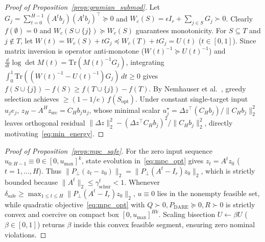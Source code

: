 \documentclass[journal]{IEEEtran}
\begin{document}
\begin{proof}[Proof of Proposition~\ref{prop:gramian_submod}]
Let $G_j = \sum_{t=0}^{H-1}(A^t b_j)(A^t b_j)^\top \succeq 0$ and $W_c(S) = \epsilon I_r + \sum_{j\in S}G_j \succ 0$. Clearly $f(\emptyset) = 0$ and $W_c(S\cup\{j\}) \succeq W_c(S)$ guarantees monotonicity. For $S \subseteq T$ and $j \notin T$, let $W(t) = W_c(S) + t G_j \preceq W_c(T) + t G_j = U(t)$ ($t \in [0, 1]$). Since matrix inversion is operator anti-monotone ($W(t)^{-1} \succeq U(t)^{-1}$) and $\frac{d}{dt}\log\det M(t) = \mathrm{Tr}(M(t)^{-1}G_j)$, integrating $\int_0^1 \mathrm{Tr}((W(t)^{-1} - U(t)^{-1})G_j)\,dt \ge 0$ gives $f(S\cup\{j\}) - f(S) \ge f(T\cup\{j\}) - f(T)$. By Nemhauser et al.\ \cite{nemhauser1978analysis,summers2016submodularity}, greedy selection achieves $\ge (1 - 1/e)\,f(S_{\mathrm{opt}})$. Under constant single-target input $u_j e_j$, $z_H - A^H z_{\mathrm{src}} = C_H b_j u_j$, whose minimal scalar $u_j^\star = \Delta z^\top (C_H b_j)/\|C_H b_j\|_2^2$ leaves orthogonal residual $\|\Delta z\|_2^2 - (\Delta z^\top C_H b_j)^2/\|C_H b_j\|_2^2$, directly motivating~\eqref{eq:min_energy}.
\end{proof}

\begin{proof}[Proof of Proposition~\ref{prop:mpc_safe}]
For the zero input sequence $u_{0:H-1} \equiv 0 \in [0, u_{\max}]^k$, state evolution in~\eqref{eq:mpc_opt} gives $z_t = A^t z_0$ ($t=1,\dots,H$). Thus $\|P_\perp(z_t - z_0)\|_2 = \|P_\perp(A^t - I_r)z_0\|_2$, which is strictly bounded because $\|A^t\|_2 \le \gamma_{\mathrm{schur}}^t < 1$. Whenever $\delta_{\mathrm{safe}} \ge \max_{1\le t\le H}\|P_\perp(A^t - I_r)z_0\|_2$, $u \equiv 0$ lies in the nonempty feasible set, while quadratic objective~\eqref{eq:mpc_opt} with $Q \succ 0, P_{\mathrm{DARE}} \succeq 0, R \succ 0$ is strictly convex and coercive on compact box $[0, u_{\max}]^{Hk}$. Scaling bisection $U \leftarrow \beta U$ ($\beta \in [0, 1]$) returns $\beta$ inside this convex feasible segment, ensuring zero nominal violations.
\end{proof}
\end{document}
